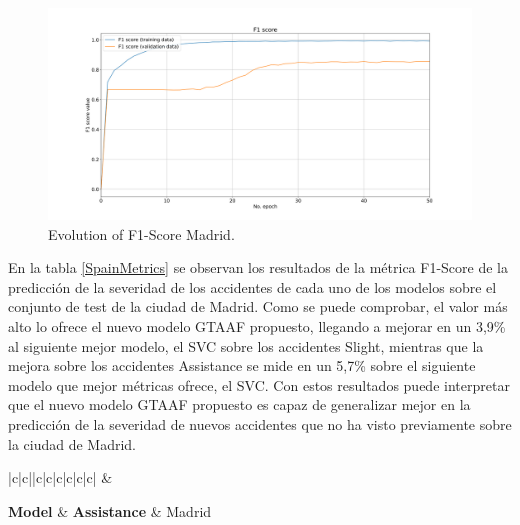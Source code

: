 \documentclass{uathesis-es}
\begin{document}
{\begin{figure}[H]
\centering
    \includegraphics[width=160mm]{Figures/Madrid/madrid_convolution_2d_f1_score_2023-12-03-12 54 29.png}
    \caption{Evolution of F1-Score Madrid.}
\label{MadridLossFunction}
\end{figure}

En la tabla \ref{SpainMetrics} se observan los resultados de la métrica F1-Score de la predicción de la severidad de los accidentes de cada uno de los modelos sobre el conjunto de test de la ciudad de Madrid. Como se puede comprobar, el valor más alto lo ofrece el nuevo modelo GTAAF propuesto, llegando a mejorar en un 3,9\% al siguiente mejor modelo, el SVC sobre los accidentes Slight, mientras que la mejora sobre los accidentes Assistance se mide en un 5,7\% sobre el siguiente modelo que mejor métricas ofrece, el SVC. Con estos resultados puede interpretar que el nuevo modelo GTAAF propuesto es capaz de generalizar mejor en la predicción de la severidad de nuevos accidentes que no ha visto previamente sobre la ciudad de Madrid.

\begin{table}[H]
	\begin{center}
		\begin{tabular}{|c|c||c|c|c|c|c|c|}
		\hline
		 &
		 \\ \hline

		\textbf{Model} & \textbf{Assistance} & Madrid
		\\ \hline \hline


\end{tabular}
\end{center}
\end{table}}
\end{document}
